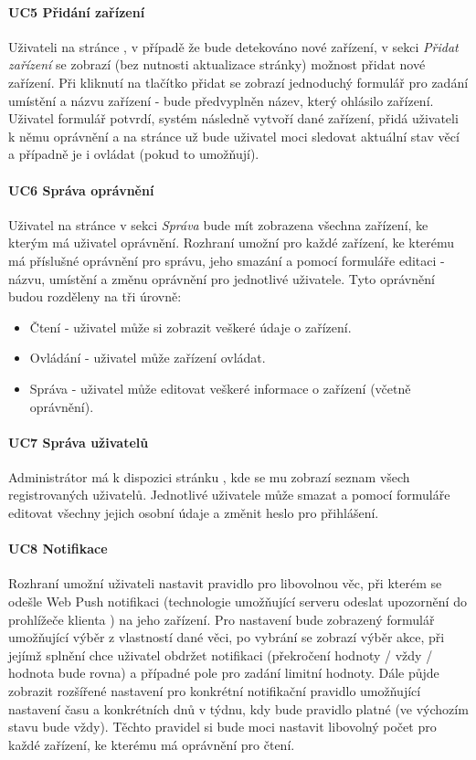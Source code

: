 \paragraph{UC5 Přidání zařízení}
\label{UC5}
Uživateli na stránce , v případě že bude detekováno nové zařízení, v sekci \textit{Přidat zařízení} se zobrazí (bez nutnosti aktualizace stránky) možnost přidat nové zařízení. Při kliknutí na tlačítko přidat se zobrazí jednoduchý formulář pro zadání umístění a názvu zařízení - bude předvyplněn název, který ohlásilo zařízení. Uživatel formulář potvrdí, systém následně vytvoří dané zařízení, přidá uživateli k němu oprávnění a na stránce  už bude uživatel moci sledovat aktuální stav věcí a případně je i ovládat (pokud to umožňují).

\paragraph{UC6 Správa oprávnění}
Uživatel na stránce  v sekci \textit{Správa} bude mít zobrazena všechna zařízení, ke kterým má uživatel oprávnění. Rozhraní umožní pro každé zařízení, ke kterému má příslušné oprávnění pro správu, jeho smazání a pomocí formuláře editaci - názvu, umístění a změnu oprávnění pro jednotlivé uživatele. Tyto oprávnění budou rozděleny na tři úrovně:
\begin{itemize}
    \item Čtení - uživatel může si zobrazit veškeré údaje o zařízení.
    \item Ovládání - uživatel může zařízení ovládat.
    \item Správa - uživatel může editovat veškeré informace o zařízení (včetně oprávnění).
\end{itemize}

\paragraph{UC7 Správa uživatelů}
Administrátor má k dispozici stránku , kde se mu zobrazí seznam všech registrovaných uživatelů. Jednotlivé uživatele může smazat a pomocí formuláře editovat všechny jejich osobní údaje a změnit heslo pro přihlášení.

\paragraph{UC8 Notifikace}
Rozhraní umožní uživateli nastavit pravidlo pro libovolnou věc, při kterém se odešle Web Push notifikaci (technologie umožňující serveru odeslat upozornění do prohlížeče klienta \cite{web-push}) na jeho zařízení. Pro nastavení bude zobrazený formulář umožňující výběr z vlastností dané věci, po vybrání se zobrazí výběr akce, při jejímž splnění chce uživatel obdržet notifikaci (překročení hodnoty / vždy / hodnota bude rovna) a případné pole pro zadání limitní hodnoty. Dále půjde zobrazit rozšířené nastavení pro konkrétní notifikační pravidlo umožňující nastavení času a konkrétních dnů v týdnu, kdy bude pravidlo platné (ve výchozím stavu bude vždy). Těchto pravidel si bude moci nastavit libovolný počet pro každé zařízení, ke kterému má oprávnění pro čtení.



